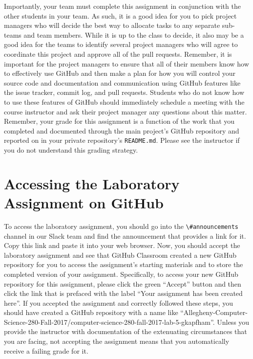 \documentclass[11pt]{article}
\newcommand{\reflection}{\lstinline{README.md}}
\newcommand{\channel}[1]{\lstinline{#1}}
\begin{document}
Importantly, your team must complete this assignment in conjunction with the other students in your team. As such, it is
a good idea for you to pick project managers who will decide the best way to allocate tasks to any separate sub-teams
and team members. While it is up to the class to decide, it also may be a good idea for the teams to identify several
project managers who will agree to coordinate this project and approve all of the pull requests. Remember, it is
important for the project managers to ensure that all of their members know how to effectively use GitHub and then make
a plan for how you will control your source code and documentation and communication using GitHub features like the
issue tracker, commit log, and pull requests. Students who do not know how to use these features of GitHub should
immediately schedule a meeting with the course instructor and ask their project manager any questions about this matter.
Remember, your grade for this assignment is a function of the work that you completed and documented through the main
project's GitHub repository and reported on in your private repository's \reflection{}. Please see the instructor if you
do not understand this grading strategy.

\section*{Accessing the Laboratory Assignment on GitHub}

To access the laboratory assignment, you should go into the \channel{\#announcements} channel in our Slack team and find
the announcement that provides a link for it. Copy this link and paste it into your web browser. Now, you should accept
the laboratory assignment and see that GitHub Classroom created a new GitHub repository for you to access the
assignment's starting materials and to store the completed version of your assignment. Specifically, to access your new
GitHub repository for this assignment, please click the green ``Accept'' button and then click the link that is prefaced
with the label ``Your assignment has been created here''. If you accepted the assignment and correctly followed these
steps, you should have created a GitHub repository with a name like
``Allegheny-Computer-Science-280-Fall-2017/computer-science-280-fall-2017-lab-5-gkapfham''. Unless you provide the
instructor with documentation of the extenuating circumstances that you are facing, not accepting the assignment means
that you automatically receive a failing grade for it.
\end{document}

